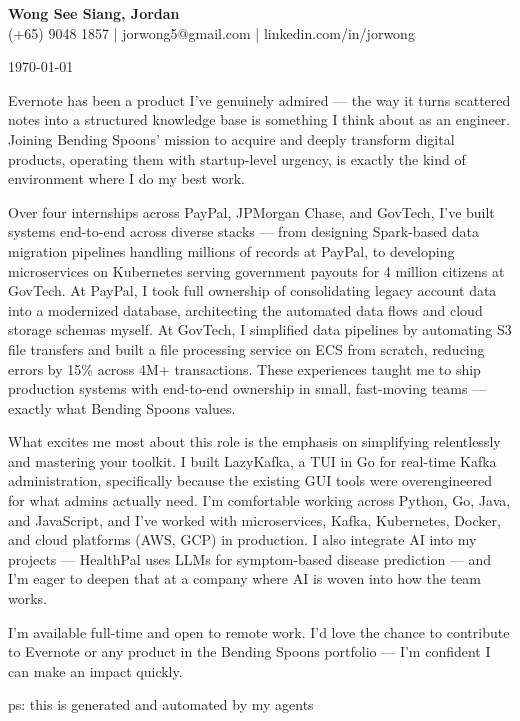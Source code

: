 \documentclass[11pt]{article}
\begin{document}
\begin{center}
    \textbf{\Large Wong See Siang, Jordan} \\[2pt]
    \small (+65) 9048 1857 | jorwong5@gmail.com | linkedin.com/in/jorwong
\end{center}

\vspace{8pt}

\today

\vspace{8pt}

Evernote has been a product I've genuinely admired — the way it turns scattered notes into a structured knowledge base is something I think about as an engineer. Joining Bending Spoons' mission to acquire and deeply transform digital products, operating them with startup-level urgency, is exactly the kind of environment where I do my best work.

Over four internships across PayPal, JPMorgan Chase, and GovTech, I've built systems end-to-end across diverse stacks — from designing Spark-based data migration pipelines handling millions of records at PayPal, to developing microservices on Kubernetes serving government payouts for 4 million citizens at GovTech. At PayPal, I took full ownership of consolidating legacy account data into a modernized database, architecting the automated data flows and cloud storage schemas myself. At GovTech, I simplified data pipelines by automating S3 file transfers and built a file processing service on ECS from scratch, reducing errors by 15\% across 4M+ transactions. These experiences taught me to ship production systems with end-to-end ownership in small, fast-moving teams — exactly what Bending Spoons values.

What excites me most about this role is the emphasis on simplifying relentlessly and mastering your toolkit. I built LazyKafka, a TUI in Go for real-time Kafka administration, specifically because the existing GUI tools were overengineered for what admins actually need. I'm comfortable working across Python, Go, Java, and JavaScript, and I've worked with microservices, Kafka, Kubernetes, Docker, and cloud platforms (AWS, GCP) in production. I also integrate AI into my projects — HealthPal uses LLMs for symptom-based disease prediction — and I'm eager to deepen that at a company where AI is woven into how the team works.

I'm available full-time and open to remote work. I'd love the chance to contribute to Evernote or any product in the Bending Spoons portfolio — I'm confident I can make an impact quickly.

ps: this is generated and automated by my agents
\end{document}
